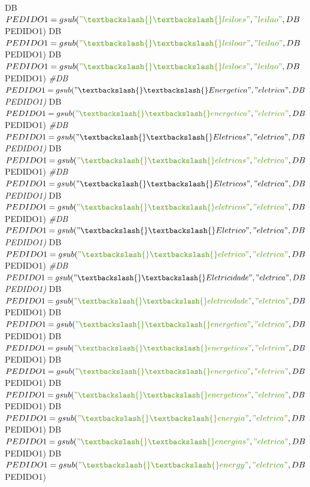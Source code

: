 \documentclass[]{article}
\newenvironment{Shaded}{\begin{snugshade}}{\end{snugshade}}
\newcommand{\CommentTok}[1]{\textcolor[rgb]{0.56,0.35,0.01}{\textit{#1}}}
\newcommand{\NormalTok}[1]{#1}
\newcommand{\StringTok}[1]{\textcolor[rgb]{0.31,0.60,0.02}{#1}}
\begin{document}
\begin{Shaded}
\begin{Highlighting}[]
\NormalTok{DB$PEDIDO1 =gsub(}\StringTok{"\textbackslash{}\textbackslash{} leiloes "}\NormalTok{, }\StringTok{"leilao"}\NormalTok{, DB$PEDIDO1)}
\NormalTok{DB$PEDIDO1 =gsub(}\StringTok{"\textbackslash{}\textbackslash{} leiloar "}\NormalTok{, }\StringTok{"leilao"}\NormalTok{, DB$PEDIDO1)}
\NormalTok{DB$PEDIDO1 =gsub(}\StringTok{"\textbackslash{}\textbackslash{} leiloes "}\NormalTok{, }\StringTok{"leilao"}\NormalTok{, DB$PEDIDO1)}
\CommentTok{#DB$PEDIDO1 =gsub("\textbackslash{}\textbackslash{} Energetica ", "eletrica", DB$PEDIDO1)}
\NormalTok{DB$PEDIDO1 =gsub(}\StringTok{"\textbackslash{}\textbackslash{} energetica "}\NormalTok{, }\StringTok{"eletrica"}\NormalTok{, DB$PEDIDO1)}
\CommentTok{#DB$PEDIDO1 =gsub("\textbackslash{}\textbackslash{} Eletricas ", "eletrica", DB$PEDIDO1)}
\NormalTok{DB$PEDIDO1 =gsub(}\StringTok{"\textbackslash{}\textbackslash{} eletricas "}\NormalTok{, }\StringTok{"eletrica"}\NormalTok{, DB$PEDIDO1)}
\CommentTok{#DB$PEDIDO1 =gsub("\textbackslash{}\textbackslash{} Eletricos ", "eletrica", DB$PEDIDO1)}
\NormalTok{DB$PEDIDO1 =gsub(}\StringTok{"\textbackslash{}\textbackslash{} eletricos "}\NormalTok{, }\StringTok{"eletrica"}\NormalTok{, DB$PEDIDO1)}
\CommentTok{#DB$PEDIDO1 =gsub("\textbackslash{}\textbackslash{} Eletrico ", "eletrica", DB$PEDIDO1)}
\NormalTok{DB$PEDIDO1 =gsub(}\StringTok{"\textbackslash{}\textbackslash{} eletrico "}\NormalTok{, }\StringTok{"eletrica"}\NormalTok{, DB$PEDIDO1)}
\CommentTok{#DB$PEDIDO1 =gsub("\textbackslash{}\textbackslash{} Eletricidade ", "eletrica", DB$PEDIDO1)}
\NormalTok{DB$PEDIDO1 =gsub(}\StringTok{"\textbackslash{}\textbackslash{} eletricidade "}\NormalTok{, }\StringTok{"eletrica"}\NormalTok{, DB$PEDIDO1)}
\NormalTok{DB$PEDIDO1 =gsub(}\StringTok{"\textbackslash{}\textbackslash{} energetica "}\NormalTok{, }\StringTok{"eletrica"}\NormalTok{, DB$PEDIDO1)}
\NormalTok{DB$PEDIDO1 =gsub(}\StringTok{"\textbackslash{}\textbackslash{} energeticas "}\NormalTok{, }\StringTok{"eletrica"}\NormalTok{, DB$PEDIDO1)}
\NormalTok{DB$PEDIDO1 =gsub(}\StringTok{"\textbackslash{}\textbackslash{} energetico "}\NormalTok{, }\StringTok{"eletrica"}\NormalTok{, DB$PEDIDO1)}
\NormalTok{DB$PEDIDO1 =gsub(}\StringTok{"\textbackslash{}\textbackslash{} energeticos "}\NormalTok{, }\StringTok{"eletrica"}\NormalTok{, DB$PEDIDO1)}
\NormalTok{DB$PEDIDO1 =gsub(}\StringTok{"\textbackslash{}\textbackslash{} energia "}\NormalTok{, }\StringTok{"eletrica"}\NormalTok{, DB$PEDIDO1)}
\NormalTok{DB$PEDIDO1 =gsub(}\StringTok{"\textbackslash{}\textbackslash{} energias "}\NormalTok{, }\StringTok{"eletrica"}\NormalTok{, DB$PEDIDO1)}
\NormalTok{DB$PEDIDO1 =gsub(}\StringTok{"\textbackslash{}\textbackslash{} energy "}\NormalTok{, }\StringTok{"eletrica"}\NormalTok{, DB$PEDIDO1)}

\end{Highlighting}
\end{Shaded}
\end{document}
